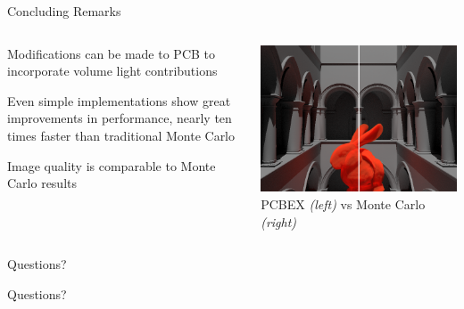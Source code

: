 \documentclass[10pt,compress,professionalfont]{beamer}
\begin{document}
\begin{frame}{Concluding Remarks}

    \begin{columns}
        \begin{column}{0.5\textwidth}

            Modifications can be made to PCB to incorporate volume light contributions\\
            \vspace{8mm}

            Even simple implementations show great improvements in performance, nearly ten times faster than traditional Monte Carlo\\
            \vspace{8mm}

            Image quality is comparable to Monte Carlo results

        \end{column}
        \begin{column}{0.5\textwidth}
            \includegraphics[width=\textwidth]{../img/compare}\\
            {\centering\scriptsize PCBEX \textit{(left)} vs Monte Carlo \textit{(right)} \\}
        \end{column}
    \end{columns}

\end{frame}



\begin{frame}{Questions?}

    {\centering Questions?}

\end{frame}
\end{document}
